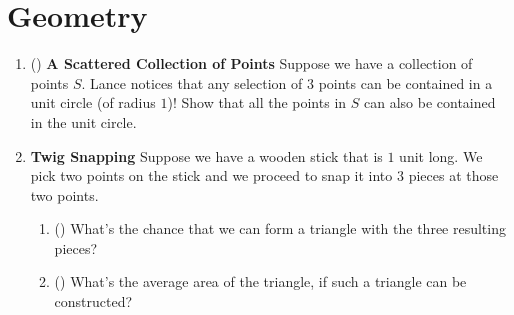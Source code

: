 \documentclass[11pt]{scrartcl}
\begin{document}
\section{Geometry}
\begin{enumerate}[label=\textbf{G\arabic*}.]
    \item (\fullchili) \textbf{A Scattered Collection of Points} \newline
    Suppose we have a collection of points $S$. Lance notices that any selection of $3$ points can be contained in a unit circle (of radius $1$)! Show that all the points in $S$ can also be contained in the unit circle.
    
    \item \textbf{Twig Snapping} \newline
    Suppose we have a wooden stick that is $1$ unit long. We pick two points on the stick and we proceed to snap it into $3$ pieces at those two points.
    \begin{enumerate}
        \item (\starproblem) What's the chance that we can form a triangle with the three resulting pieces?
        
        \item (\fullchili) What's the average area of the triangle, if such a triangle can be constructed? 
    \end{enumerate}
\end{enumerate}

\newpage
\end{document}
